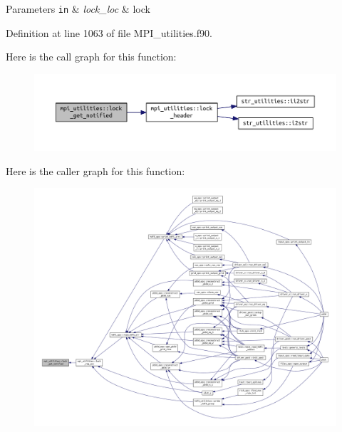 \begin{DoxyParams}[1]{Parameters}
\mbox{\tt in}  & {\em lock\+\_\+loc} & lock \\
\hline
\end{DoxyParams}


Definition at line 1063 of file M\+P\+I\+\_\+utilities.\+f90.

Here is the call graph for this function\+:\nopagebreak
\begin{figure}[H]
\begin{center}
\leavevmode
\includegraphics[width=350pt]{namespacempi__utilities_a17c39b0498528e2532c8347b0b7dec86_cgraph}
\end{center}
\end{figure}
Here is the caller graph for this function\+:\nopagebreak
\begin{figure}[H]
\begin{center}
\leavevmode
\includegraphics[width=350pt]{namespacempi__utilities_a17c39b0498528e2532c8347b0b7dec86_icgraph}
\end{center}
\end{figure}
\mbox{\label{namespacempi__utilities_abe5bf3ae3b6a06eda18c2f4d62ac09c5}} 
